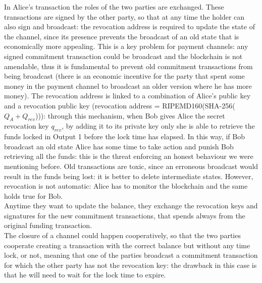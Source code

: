In Alice's transaction the roles of the two parties are exchanged. These transactions are signed by the other party, so that at any time the holder can also sign and broadcast: the revocation address is required to update the state of the channel, since its presence prevents the broadcast of an old state that is economically more appealing. This is a key problem for payment channels: any signed commitment transaction could be broadcast and the blockchain is not amendable, thus it is fundamental to prevent old commitment transactions from being broadcast (there is an economic incentive for the party that spent some money in the payment channel to broadcast an older version where he has more money). The revocation address is linked to a combination of Alice's public key and a revocation public key (revocation address = RIPEMD160(SHA-256($Q_A + Q_{rev}$))): through this mechanism, when Bob gives Alice the secret revocation key $q_{rev}$, by adding it to its private key only she is able to retrieve the funds locked in Output 1 before the lock time has elapsed. In this way, if Bob broadcast an old state Alice has some time to take action and punish Bob retrieving all the funds: this is the threat enforcing an honest behaviour we were mentioning before. Old transactions are toxic, since an erroneous broadcast would result in the funds being lost: it is better to delete intermediate states. However, revocation is not automatic: Alice has to monitor the blockchain and the same holds true for Bob.
\\
Anytime they want to update the balance, they exchange the revocation keys and signatures for the new commitment transactions, that spends always from the original funding transaction.
\\
The closure of a channel could happen cooperatively, so that the two parties cooperate creating a transaction with the correct balance but without any time lock, or not, meaning that one of the parties broadcast a commitment transaction for which the other party has not the revocation key: the drawback in this case is that he will need to wait for the lock time to expire.  

